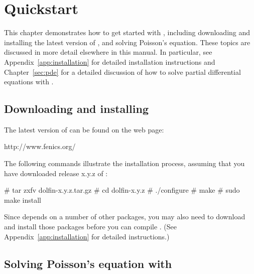 \chapter{Quickstart}
\label{chap:quickstart}

This chapter demonstrates how to get started with \dolfin{}, including
downloading and installing the latest version of \dolfin{}, and solving
Poisson's equation. These topics are discussed in more detail
elsewhere in this manual. In particular, see
Appendix~\ref{app:installation} for detailed installation instructions
and Chapter~\ref{sec:pde} for a detailed discussion of how to solve
partial differential equations with \dolfin{}.

\section{Downloading and installing \dolfin{}}

The latest version of \dolfin{} can be found on the \fenics{} web page:
\begin{code}
http://www.fenics.org/
\end{code}
The following commands illustrate the installation process, assuming
that you have downloaded release x.y.z of \dolfin{}:
\begin{code}
# tar zxfv dolfin-x.y.z.tar.gz
# cd dolfin-x.y.z
# ./configure
# make
# sudo make install
\end{code}

Since \dolfin{} depends on a number of other packages, you may also
need to download and install those packages before you can compile
\dolfin{}.  (See Appendix~\ref{app:installation} for detailed
instructions.)

\section{Solving Poisson's equation with \dolfin{}}

